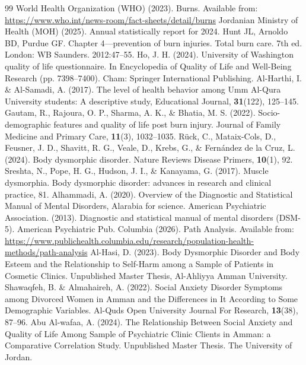 \documentclass{NSP1}
\begin{document}
\begin{thebibliography}{99}
 World Health Organization (WHO) (2023). Burns. Available from: \url{https://www.who.int/news-room/fact-sheets/detail/burns}
 Jordanian Ministry of Health (MOH) (2025). Annual statistically report for 2024.
 Hunt JL, Arnoldo BD, Purdue GF. Chapter 4---prevention of burn injuries. Total burn care. 7th ed. London: WB Saunders. 2012:47--55.
 Ho, J. H. (2024). University of Washington quality of life questionnaire. In Encyclopedia of Quality of Life and Well-Being Research (pp. 7398--7400). Cham: Springer International Publishing.
 Al-Harthi, I. \& Al-Samadi, A. (2017). The level of health behavior among Umm Al-Qura University students: A descriptive study, Educational Journal, \textbf{31}(122), 125--145.
 Gautam, R., Rajoura, O. P., Sharma, A. K., \& Bhatia, M. S. (2022). Socio-demographic features and quality of life post burn injury. Journal of Family Medicine and Primary Care, \textbf{11}(3), 1032--1035.
 R\"uck, C., Mataix-Cols, D., Feusner, J. D., Shavitt, R. G., Veale, D., Krebs, G., \& Fern\'andez de la Cruz, L. (2024). Body dysmorphic disorder. Nature Reviews Disease Primers, \textbf{10}(1), 92.
 Sreshta, N., Pope, H. G., Hudson, J. I., \& Kanayama, G. (2017). Muscle dysmorphia. Body dysmorphic disorder: advances in research and clinical practice, 81.
 Alhammadi, A. (2020). Overview of the Diagnostic and Statistical Manual of Mental Disorders, Alarabia for science.
 American Psychiatric Association. (2013). Diagnostic and statistical manual of mental disorders (DSM-5\textregistered). American Psychiatric Pub.
 Columbia (2026). Path Analysis. Available from: \url{https://www.publichealth.columbia.edu/research/population-health-methods/path-analysis}
 Al-Hasi, D. (2023). Body Dysmorphic Disorder and Body Esteem and the Relationship to Self-Harm among a Sample of Patients in Cosmetic Clinics. Unpublished Master Thesis, Al-Ahliyya Amman University.
 Shawaqfeh, B. \& Almahaireh, A. (2022). Social Anxiety Disorder Symptoms among Divorced Women in Amman and the Differences in It According to Some Demographic Variables. Al-Quds Open University Journal For Research, \textbf{13}(38), 87--96.
 Abu Al-wafaa, A. (2024). The Relationship Between Social Anxiety and Quality of Life Among Sample of Psychiatric Clinic Clients in Amman: a Comparative Correlation Study. Unpublished Master Thesis. The University of Jordan.

\end{thebibliography}
\end{document}
